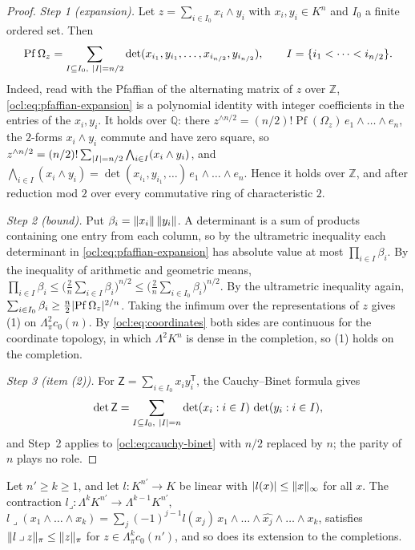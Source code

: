 \begin{proof}
\emph{Step 1 (expansion).} Let $z=\sum_{i\in I_0}x_i\wedge y_i$ with $x_i,y_i\in K^n$ and $I_0$ a finite ordered set.
Then
\begin{equation}\label{ocl:eq:pfaffian-expansion}
\operatorname{Pf}\Omega_z=\sum_{I\subseteq I_0,\ \lvert I\rvert=n/2}\det(x_{i_1},y_{i_1},\dots,x_{i_{n/2}},y_{i_{n/2}}),
\qquad I=\{i_1<\dots<i_{n/2}\}.
\end{equation}
Indeed, read with the Pfaffian of the alternating matrix of $z$ over $\mathbb Z$, \eqref{ocl:eq:pfaffian-expansion} is
a polynomial identity with integer coefficients in the entries of the $x_i,y_i$. It holds over $\mathbb Q$: there
$z^{\wedge n/2}=(n/2)!\operatorname{Pf}(\Omega_z)\,e_1\wedge\dots\wedge e_n$, the $2$-forms $x_i\wedge y_i$ commute and
have zero square, so $z^{\wedge n/2}=(n/2)!\sum_{\lvert I\rvert=n/2}\bigwedge_{i\in I}(x_i\wedge y_i)$, and
$\bigwedge_{i\in I}(x_i\wedge y_i)=\det(x_{i_1},y_{i_1},\dots)\,e_1\wedge\dots\wedge e_n$. Hence it holds over
$\mathbb Z$, and after reduction mod $2$ over every commutative ring of characteristic $2$.

\emph{Step 2 (bound).} Put $\beta_i=\lVert x_i\rVert\,\lVert y_i\rVert$. A determinant is a sum of products containing one entry from each
column, so by the ultrametric inequality each determinant in \eqref{ocl:eq:pfaffian-expansion} has absolute value at
most $\prod_{i\in I}\beta_i$. By the inequality of arithmetic and geometric means,
$\prod_{i\in I}\beta_i\le\bigl(\frac2n\sum_{i\in I}\beta_i\bigr)^{n/2}\le\bigl(\frac2n\sum_{i\in I_0}\beta_i\bigr)^{n/2}$.
By the ultrametric inequality again, $\sum_{i\in I_0}\beta_i\ge\frac n2\lvert \operatorname{Pf}\Omega_z\rvert^{2/n}$. Taking the
infimum over the representations of $z$ gives (1) on $\Lambda^2_\pi c_0(n)$. By \eqref{ocl:eq:coordinates} both
sides are continuous for the coordinate topology, in which $\Lambda^2K^n$ is dense in the completion, so (1) holds on
the completion.

\emph{Step 3 (item (2)).} For $\mathsf Z=\sum_{i\in I_0}x_iy_i^{\mathsf T}$, the Cauchy--Binet formula gives
\begin{equation}\label{ocl:eq:cauchy-binet}
\det\mathsf Z=\sum_{I\subseteq I_0,\ \lvert I\rvert=n}\det(x_i:i\in I)\,\det(y_i:i\in I),
\end{equation}
and Step~2 applies to \eqref{ocl:eq:cauchy-binet} with $n/2$ replaced by $n$; the parity of $n$ plays no role.
\end{proof}

\begin{lemma}[contractions]\label{ocl:lem:contraction}
Let $n'\ge k\ge1$, and let $l\colon K^{n'}\to K$ be linear with $\lvert l(x)\rvert\le\lVert x\rVert_\infty$ for all $x$. The contraction
$l\mathbin{\lrcorner}\colon\Lambda^kK^{n'}\to\Lambda^{k-1}K^{n'}$,
$l\mathbin{\lrcorner}(x_1\wedge\dots\wedge x_k)=\sum_j(-1)^{j-1}l(x_j)\,x_1\wedge\dots\wedge\widehat{x_j}\wedge\dots\wedge x_k$,
satisfies $\lVert l\mathbin{\lrcorner} z\rVert_\pi\le\lVert z\rVert_\pi$ for $z\in\Lambda^k_\pi c_0(n')$, and so does its extension to the
completions.
\end{lemma}

